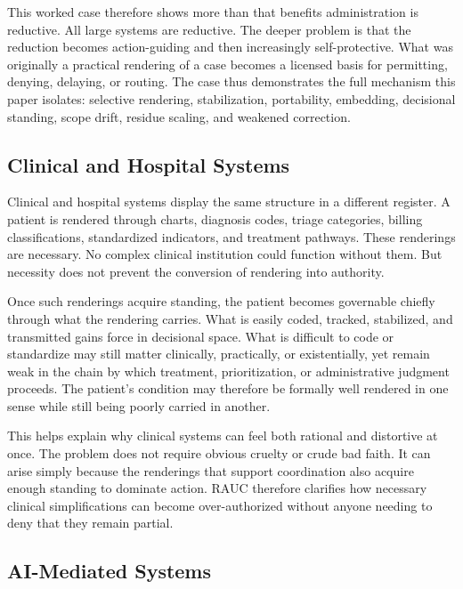\documentclass[11pt]{article}
\begin{document}
This worked case therefore shows more than that benefits administration is reductive. All large systems are reductive. The deeper problem is that the reduction becomes action-guiding and then increasingly self-protective. What was originally a practical rendering of a case becomes a licensed basis for permitting, denying, delaying, or routing. The case thus demonstrates the full mechanism this paper isolates: selective rendering, stabilization, portability, embedding, decisional standing, scope drift, residue scaling, and weakened correction.

\subsection{Clinical and Hospital Systems}

Clinical and hospital systems display the same structure in a different register. A patient is rendered through charts, diagnosis codes, triage categories, billing classifications, standardized indicators, and treatment pathways. These renderings are necessary. No complex clinical institution could function without them. But necessity does not prevent the conversion of rendering into authority.\cite{BowkerStar1999SortingThingsOut,Porter1995TrustInNumbers,Power1997AuditSociety}

Once such renderings acquire standing, the patient becomes governable chiefly through what the rendering carries. What is easily coded, tracked, stabilized, and transmitted gains force in decisional space. What is difficult to code or standardize may still matter clinically, practically, or existentially, yet remain weak in the chain by which treatment, prioritization, or administrative judgment proceeds. The patient's condition may therefore be formally well rendered in one sense while still being poorly carried in another.\cite{BowkerStar1999SortingThingsOut,ObermeyerEtAl2019DissectingRacialBias}

This helps explain why clinical systems can feel both rational and distortive at once. The problem does not require obvious cruelty or crude bad faith. It can arise simply because the renderings that support coordination also acquire enough standing to dominate action. RAUC therefore clarifies how necessary clinical simplifications can become over-authorized without anyone needing to deny that they remain partial.

\subsection{AI-Mediated Systems}
\end{document}
